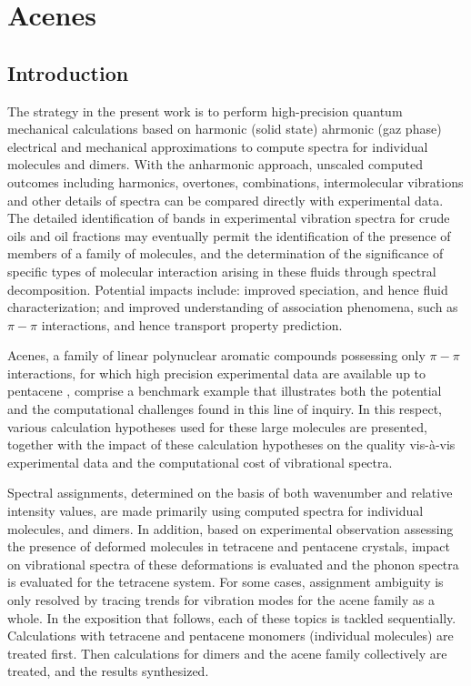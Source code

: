\chapter[4]{Acenes}
\minitoc
\restoregeometry

\newpage

\section*{Introduction}

The strategy in the present work is to perform high-precision quantum mechanical calculations based on harmonic (solid state) ahrmonic (gaz phase) electrical and mechanical approximations to compute spectra for individual molecules and dimers. With the anharmonic approach, unscaled computed outcomes including harmonics, overtones, combinations, intermolecular vibrations and other details of spectra can be compared directly with experimental data. The detailed identification of bands in experimental vibration spectra for crude oils and oil fractions may eventually permit the identification of the presence of members of a family of molecules, and the determination of the significance of specific types of molecular interaction arising in these fluids through spectral decomposition. Potential impacts include: improved speciation, and hence fluid characterization; and improved understanding of association phenomena, such as $\pi-\pi$ interactions, and hence transport property prediction. 

Acenes, a family of linear polynuclear aromatic compounds possessing only $\pi-\pi$ interactions, for which high precision experimental data are available up to pentacene \cite{michaelian2012far}, comprise a benchmark example that illustrates both the potential and the computational challenges found in this line of inquiry. In this respect, various calculation hypotheses used for these large molecules are presented, together with the impact of these calculation hypotheses on the quality vis-à-vis experimental data and the computational cost of vibrational spectra. 

Spectral assignments, determined on the basis of both wavenumber and relative intensity values, are made primarily using computed spectra for individual molecules, and dimers. In addition, based on experimental observation assessing the presence of deformed molecules in tetracene and pentacene crystals, impact on vibrational spectra of these deformations is evaluated and the phonon spectra is evaluated for the tetracene system. For some cases, assignment ambiguity is only resolved by tracing trends for vibration modes for the acene family as a whole. In the exposition that follows, each of these topics is tackled sequentially. Calculations with tetracene and pentacene monomers (individual molecules) are treated first. Then calculations for dimers and the acene family collectively are treated, and the results synthesized.

